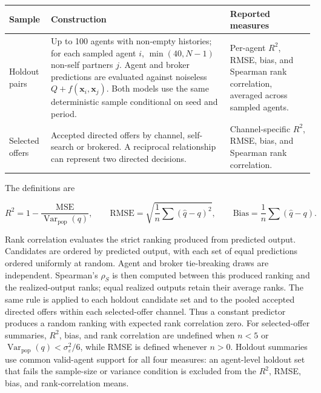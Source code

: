 \documentclass[11pt]{article}
\begin{document}
{
\begin{longtable}[]{@{}
  >{\raggedright\arraybackslash}p{}
  >{\raggedright\arraybackslash}p{}
  >{\raggedright\arraybackslash}p{}@{}}
\toprule\noalign{}
\begin{minipage}[b]{\linewidth}\raggedright
Sample
\end{minipage} & \begin{minipage}[b]{\linewidth}\raggedright
Construction
\end{minipage} & \begin{minipage}[b]{\linewidth}\raggedright
Reported measures
\end{minipage} \\
\midrule\noalign{}
\endhead
\bottomrule\noalign{}
\endlastfoot
Holdout pairs & Up to 100 agents with non-empty histories; for each sampled agent \(i\), \(\min(40,N-1)\) non-self partners \(j\). Agent and broker predictions are evaluated against noiseless \(Q + f(\mathbf{x}_i,\mathbf{x}_j)\). Both models use the same deterministic sample conditional on seed and period. & Per-agent \(R^2\), RMSE, bias, and Spearman rank correlation, averaged across sampled agents. \\
Selected offers & Accepted directed offers by channel, self-search or brokered. A reciprocal relationship can represent two directed decisions. & Channel-specific \(R^2\), RMSE, bias, and Spearman rank correlation. \\
\end{longtable}
}

The definitions are

\[
R^2 = 1 - \frac{\mathrm{MSE}}{\operatorname{Var}_{\mathrm{pop}}(q)}, \qquad
\mathrm{RMSE} = \sqrt{\frac{1}{n}\sum(\hat{q}-q)^2}, \qquad
\mathrm{Bias} = \frac{1}{n}\sum(\hat{q}-q).
\]

Rank correlation evaluates the strict ranking produced from predicted output. Candidates are ordered by predicted output, with each set of equal predictions ordered uniformly at random. Agent and broker tie-breaking draws are independent. Spearman's \(\rho_S\) is then computed between this produced ranking and the realized-output ranks; equal realized outputs retain their average ranks. The same rule is applied to each holdout candidate set and to the pooled accepted directed offers within each selected-offer channel. Thus a constant predictor produces a random ranking with expected rank correlation zero. For selected-offer summaries, \(R^2\), bias, and rank correlation are undefined when \(n < 5\) or \(\operatorname{Var}_{\mathrm{pop}}(q) < \sigma_\varepsilon^2/6\), while RMSE is defined whenever \(n>0\). Holdout summaries use common valid-agent support for all four measures: an agent-level holdout set that fails the sample-size or variance condition is excluded from the \(R^2\), RMSE, bias, and rank-correlation means.
\end{document}
